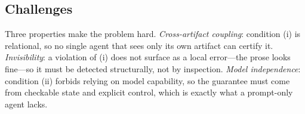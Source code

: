 \subsection{Challenges}
\label{sec:challenges}

Three properties make the problem hard. \emph{Cross-artifact coupling}: condition
(i) is relational, so no single agent that sees only its own artifact can certify
it. \emph{Invisibility}: a violation of (i) does not surface as a local error---the
prose looks fine---so it must be detected structurally, not by inspection.
\emph{Model independence}: condition (ii) forbids relying on model capability, so
the guarantee must come from checkable state and explicit control, which is
exactly what a prompt-only agent lacks.
